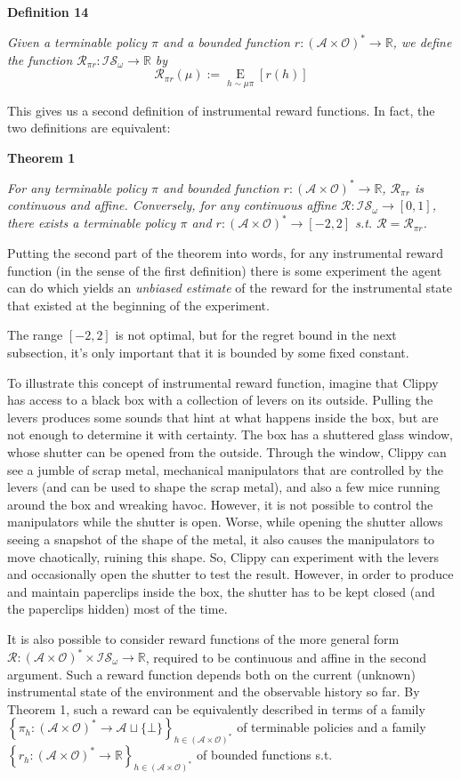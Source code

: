 \documentclass[a4paper]{article}
\newcommand{\Co}[1]{}
\newcommand{\AP}[1]{\left(#1\right)}
\newcommand{\AB}[1]{\left[#1\right]}
\newcommand{\AC}[1]{\left\{#1\right\}}
\newcommand{\Ea}[2]{\underset{#1}{\operatorname{E}}\AB{#2}}
\newcommand{\Reals}{\mathbb{R}}
\newcommand{\A}{\mathcal{A}}
\newcommand{\AX}{\A\sqcup\{\bot\}}
\newcommand{\Ob}{\mathcal{O}}
\newcommand{\AO}{\AP{\A\times\Ob}}
\newcommand{\FH}{\AO^*}
\newcommand{\R}{\mathcal{R}}
\newcommand{\IS}{\mathcal{IS}}
\begin{document}
\textbf{Definition 14}\Co{b}

\textit{Given a terminable policy $\pi$ and a bounded function $r:\FH\rightarrow\Reals$, we define the function $\R_{\pi r}:\IS_\omega\rightarrow\Reals$ by
}\Co{i}
$$\R_{\pi r}(\mu):=\Ea{h\sim\mu\pi}{r(h)}$$

This gives us a second definition of instrumental reward functions. In fact, the two definitions are equivalent:

\textbf{Theorem 1}\Co{b}

\textit{For any terminable policy $\pi$ and bounded function $r:\FH\rightarrow\Reals$, $\R_{\pi r}$ is continuous and affine. Conversely, for any continuous affine $\R:\IS_\omega\rightarrow[0,1]$, there exists a terminable policy $\pi$ and $r:\FH\rightarrow[-2,2]$ s.t. $\R = \R_{\pi r}$.}\Co{i}

Putting the second part of the theorem into words, for any instrumental reward function (in the sense of the first definition) there is some experiment the agent can do which yields an \textit{unbiased estimate}\Co{i} of the reward for the instrumental state that existed at the beginning of the experiment.

The range $[-2,2]$ is not optimal, but for the regret bound in the next subsection, it's only important that it is bounded by some fixed constant.

To illustrate this concept of instrumental reward function, imagine that Clippy has access to a black box with a collection of levers on its outside. Pulling the levers produces some sounds that hint at what happens inside the box, but are not enough to determine it with certainty. The box has a shuttered glass window, whose shutter can be opened from the outside. Through the window, Clippy can see a jumble of scrap metal, mechanical manipulators that are controlled by the levers (and can be used to shape the scrap metal), and also a few mice running around the box and wreaking havoc. However, it is not possible to control the manipulators while the shutter is open. Worse, while opening the shutter allows seeing a snapshot of the shape of the metal, it also causes the manipulators to move chaotically, ruining this shape. So, Clippy can experiment with the levers and occasionally open the shutter to test the result. However, in order to produce and maintain paperclips inside the box, the shutter has to be kept closed (and the paperclips hidden) most of the time.

It is also possible to consider reward functions of the more general form $\R:\FH\times\IS_\omega\rightarrow\Reals$, required to be continuous and affine in the second argument. Such a reward function depends both on the current (unknown) instrumental state of the environment and the observable history so far. By Theorem 1, such a reward can be equivalently described in terms of a family $\AC{\pi_h:\FH\rightarrow\AX}_{h\in\FH}$ of terminable policies and a family $\AC{r_h:\FH\rightarrow\Reals}_{h\in\FH}$ of bounded functions s.t. 
\end{document}
